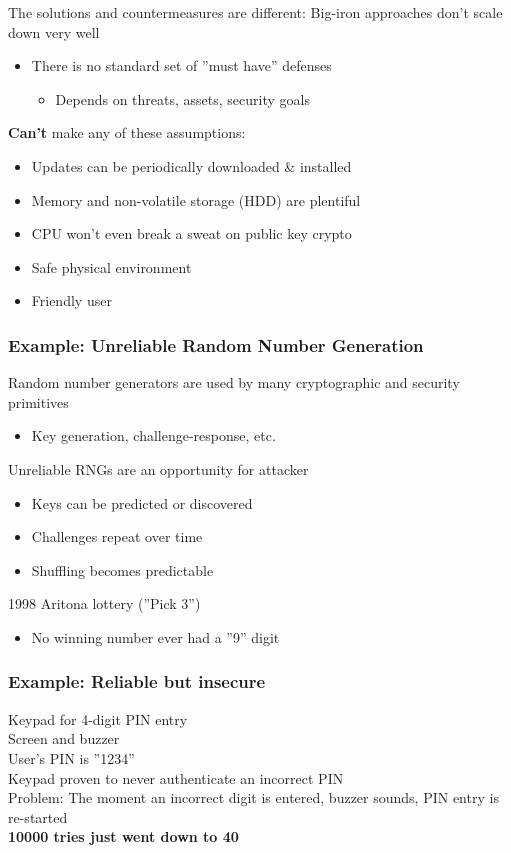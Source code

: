 The solutions and countermeasures are different:
Big-iron approaches don't scale down very well
\begin{itemize}
  \item There is no standard set of ''must have'' defenses
  \begin{itemize}
    \item Depends on threats, assets, security goals
  \end{itemize}
\end{itemize}
\textbf{Can't} make any of these assumptions:
\begin{itemize}
  \item Updates can be periodically downloaded \& installed
  \item Memory and non-volatile storage (HDD) are plentiful
  \item CPU won't even break a sweat on public key crypto
  \item Safe physical environment
  \item Friendly user
\end{itemize}

\subsubsection{Example: Unreliable Random Number Generation}
Random number generators are used by many cryptographic and security primitives
\begin{itemize}
  \item Key generation, challenge-response, etc.
\end{itemize}
Unreliable RNGs are an opportunity for attacker
\begin{itemize}
  \item Keys can be predicted or discovered
  \item Challenges repeat over time
  \item Shuffling becomes predictable
\end{itemize}
1998 Aritona lottery (''Pick 3'')
\begin{itemize}
  \item No winning number ever had a ''9'' digit
\end{itemize}

\subsubsection{Example: Reliable but insecure}
Keypad for 4-digit PIN entry\\
Screen and buzzer\\
User's PIN is ''1234''\\
Keypad proven to never authenticate an incorrect PIN\\

Problem: The moment an incorrect digit is entered, buzzer sounds, PIN entry is re-started\\
\textbf{10000 tries just went down to 40}
